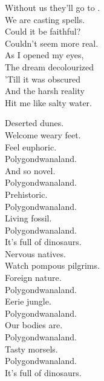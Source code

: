Without us they'll go to . \\
We are casting spells. \\

Could it be faithful? \\
Couldn't seem more real. \\
As I opened my eyes, \\
The dream decolourized \\
'Till it was obscured \\
And the harsh reality \\
Hit me like salty water. \\




Deserted dunes. \\
Welcome weary feet. \\
Feel euphoric. \\
Polygondwanaland. \\
And so novel. \\
Polygondwanaland. \\
Prehistoric. \\
Polygondwanaland. \\
Living fossil. \\
Polygondwanaland. \\
It's full of dinosaurs. \\

Nervous natives. \\
Watch pompous pilgrims. \\
Foreign nature. \\
Polygondwanaland. \\
Eerie jungle. \\
Polygondwanaland. \\
Our bodies are. \\
Polygondwanaland. \\
Tasty morsels. \\
Polygondwanaland. \\
It's full of dinosaurs. \\





